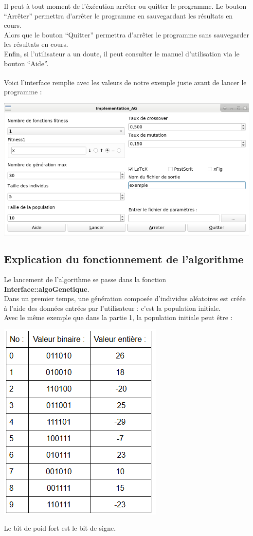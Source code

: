 \documentclass[a4paper,11pt]{article}
\begin{document}
			Il peut à tout moment de l'éxécution arrêter ou quitter le programme. Le bouton “Arrêter” permettra d’arrêter le programme en sauvegardant les résultats en cours.\\
			Alors que le bouton “Quitter” permettra d’arrêter le programme sans sauvegarder les résultats en cours.\\
			Enfin, si l’utilisateur a un doute, il peut consulter le manuel d’utilisation via le bouton “Aide”.\\\\
			Voici l’interface remplie avec les valeurs de notre exemple juste avant de lancer le programme :\\
			\centerline{\includegraphics[scale=0.5]{Interface.png}}
			
		\subsection{Explication du fonctionnement de l’algorithme}
			Le lancement de l’algorithme se passe dans la fonction \textbf{Interface::algoGenetique}.\\
			Dans un premier temps, une génération composée d’individus aléatoires est créée à l’aide des données entrées par l’utilisateur : c’est la population initiale.\\
			Avec le même exemple que dans la partie 1, la population initiale peut être :\\
			\centerline{\includegraphics[scale=0.5]{ExemplePopulationInitiale.png}}
			Le bit de poid fort est le bit de signe.\\
			
\end{document}
